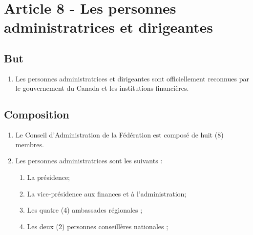 \section{Article 8 - Les personnes administratrices et dirigeantes}
\label{article-8-les-personnes-administratrices-et-dirigeantes}

\subsection{But}
\label{but-2}

\begin{enumerate}
 \item
  Les personnes administratrices et dirigeantes sont officiellement reconnues par le gouvernement du Canada et les institutions financières.
\end{enumerate}

\subsection{Composition}
\label{composition-2}

\begin{enumerate}
 \item
  Le Conseil d'Administration de la Fédération est composé de huit (8) membres.
 \item
  Les personnes administratrices sont les suivants :

  \begin{enumerate}
   \item
    La présidence;
   \item
    La vice-présidence aux finances et à l’administration;
   \item
    Les quatre (4) ambassades régionales ;
   \item
    Les deux (2) personnes conseillères nationales ;
  \end{enumerate}
\end{enumerate}
